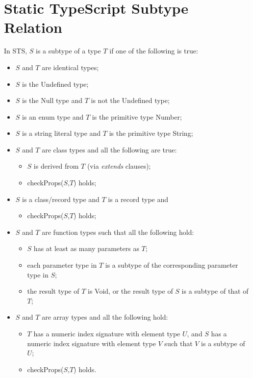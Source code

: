 \appendix
\pagebreak
\section{Static TypeScript Subtype Relation}


In STS, $S$ is a subtype of a type $T$ if one of the following is true:
\begin{itemize}
\item $S$ and $T$ are identical types;
\item $S$ is the Undefined type;
\item $S$ is the Null type and $T$ is not the Undefined type;
\item $S$ is an enum type and $T$ is the primitive type Number;
\item $S$ is a string literal type and $T$ is the primitive type String;
\item $S$ and $T$ are class types and all the following are true:
\begin{itemize}
  \item $S$ is derived from $T$ (via \emph{extends} clauses);
  \item checkProps($S$,$T$) holds;
\end{itemize}
\item $S$ is a class/record type and $T$ is a record type and
\begin{itemize}
  \item checkProps($S$,$T$) holds;
\end{itemize}
\item $S$ and $T$ are function types such that all the following hold:
\begin{itemize}
  \item $S$ has at least as many parameters as $T$;
  \item each parameter type in $T$ is a subtype of the corresponding parameter type in $S$;
  \item the result type of $T$ is Void, or the result type of $S$ is a subtype of that of $T$;
\end{itemize}
\item $S$ and $T$ are array types and all the following hold:
\begin{itemize}
\item $T$ has a numeric index signature with element type $U$,
    and $S$ has a numeric index signature with element type $V$
    such that $V$ is a subtype of $U$;
\item checkProps($S$,$T$) holds.
\end{itemize}
\end{itemize}

